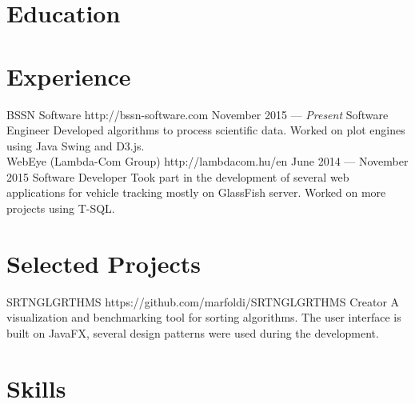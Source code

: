 \documentclass{resume}
\begin{document}

\smallskip

\section{Education}


\section{Experience}

\employer
	{BSSN Software}
	{http://bssn-software.com}
	{November 2015 --- \emph{Present}}
	{Software Engineer}
	{Developed algorithms to process scientific data. Worked on plot engines using Java Swing and D3.js.\\}
\employer
	{WebEye (Lambda-Com Group)}
	{http://lambdacom.hu/en}
	{June 2014 --- November 2015}
	{Software Developer}
	{Took part in the development of several web applications for vehicle tracking mostly on GlassFish server. Worked on more projects using T-SQL.}
	
\section{Selected Projects}

\project
	{SRTNGLGRTHMS}
	{https://github.com/marfoldi/SRTNGLGRTHMS}
	{Creator}
	{A visualization and benchmarking tool for sorting algorithms. The user interface is built on JavaFX, several design patterns were used during the development.}
	
\section{Skills}

\end{document}
